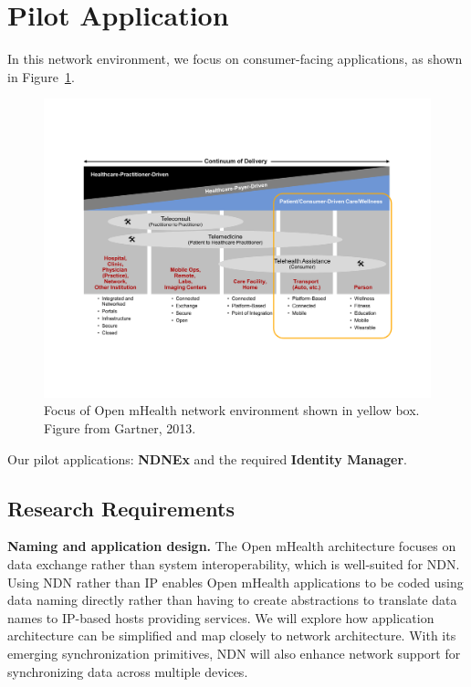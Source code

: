 \section{Pilot Application}

In this network environment, we focus on consumer-facing applications, as shown in Figure~\ref{fig:continuum}. 

\begin{figure}
\begin{center}
\includegraphics[width=.8\textwidth]{figures/continuum}
\caption{{Focus of Open mHealth network environment shown in yellow box. Figure from Gartner, 2013.  }}
\label{fig:continuum}
\end{center}
\end{figure}

Our pilot applications:  \textbf{NDNEx} and the required \textbf{Identity Manager}. 

\subsection{Research Requirements} 

{\bf Naming and application design.} The Open mHealth architecture focuses on data exchange rather than system interoperability, which is well-suited for NDN. Using NDN rather than IP enables Open mHealth applications to be coded using data naming directly rather than having to create abstractions to translate data names to IP-based hosts providing services. We will explore how application architecture can be simplified and map closely to network architecture. With its emerging synchronization primitives, NDN will also enhance network support for synchronizing data across multiple devices. 

